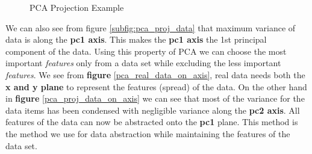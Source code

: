 \begin{figure}[!ht]
	\centering
    \hfill
    \caption{PCA Projection Example}\cite{pca_visual}
   \label{fig:pca_prog_eg}
 \end{figure}
  
  We can also see from figure \ref{subfig:pca_proj_data} that maximum variance of data is along the \textbf{pc1 axis}. This makes the \textbf{pc1 axis} the 1st principal component of the data. Using this property of PCA we can choose the most important \textit{features} only from a data set while excluding the less important \textit{features}. We see from \textbf{figure} \ref{pca_real_data_on_axis}, real data needs both the \textbf{x and y plane} to represent the features (spread) of the data. On the other hand in \textbf{figure} \ref{pca_proj_data_on_axis} we can see that most of the variance for the data items has been condensed with negligible variance along the \textbf{pc2 axis}. All features of the data can now be abstracted onto the \textbf{pc1} plane. This method is the method we use for data abstraction while maintaining the features of the data set.%
 

